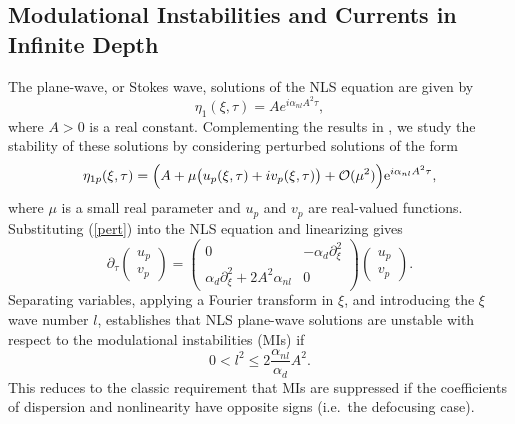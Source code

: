 \documentclass{JFM_Style/jfm}
\newcommand{\bp}{\begin{pmatrix}}
\newcommand{\ep}{\end{pmatrix}}
\newcommand{\pd}{\partial}
\begin{document}
\subsection{Modulational Instabilities and Currents in Infinite Depth}
The plane-wave, or Stokes wave, solutions of the NLS equation are given by
\begin{equation}
\eta_{1}(\xi,\tau) = A e^{i\alpha_{nl}A^{2}\tau},
\end{equation}
where $A>0$ is a real constant.  Complementing the results in \cite{thomas2012nonlinear}, we study the stability of these solutions by considering perturbed solutions of the form
\begin{equation}
\eta_{1p}(\xi,\tau) = \Big{(}A +\mu \big{(}u_{p}(\xi,\tau)+iv_{p}(\xi,\tau)\big{)} +\mathcal{O}(\mu^2)\Big{)}\mbox{e}^{i\alpha_{nl}A^{2}\tau},
\label{pert}
\end{equation}
where $\mu$ is a small real parameter and $u_{p}$ and $v_{p}$ are real-valued functions.  Substituting (\ref{pert}) into the NLS equation and linearizing gives
\[
\pd_{\tau}\bp u_{p}\\ v_{p}\ep = \bp 0 & -\alpha_{d}\pd_{\xi}^{2} \\ \alpha_{d}\pd_{\xi}^{2} + 2A^{2}\alpha_{nl} & 0 \ep \bp u_{p} \\ v_{p} \ep.
\]
Separating variables, applying a Fourier transform in $\xi$, and introducing the $\xi$ wave number $l$, establishes that NLS plane-wave solutions are unstable with respect to the modulational instabilities (MIs) if
\[
0 < l^{2} \leq 2\frac{\alpha_{nl}}{\alpha_{d}}A^{2}.
\]
This reduces to the classic requirement that MIs are suppressed if the coefficients of dispersion and nonlinearity have opposite signs (i.e.~the defocusing case).
\end{document}

